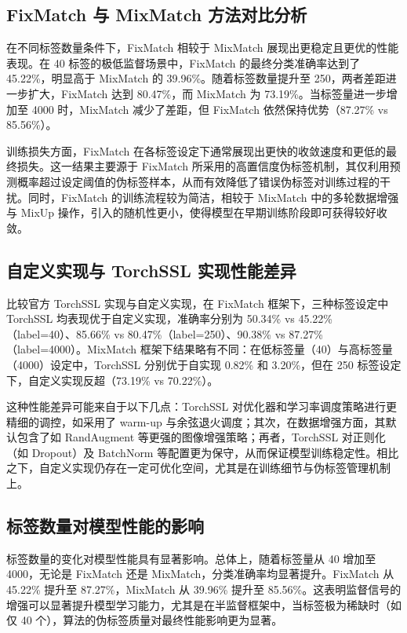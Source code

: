 \documentclass[a4paper, utf8]{ctexart}
\begin{document}
	\subsection{FixMatch 与 MixMatch 方法对比分析}
	
	在不同标签数量条件下，FixMatch 相较于 MixMatch 展现出更稳定且更优的性能表现。在 40 标签的极低监督场景中，FixMatch 的最终分类准确率达到了 45.22\%，明显高于 MixMatch 的 39.96\%。随着标签数量提升至 250，两者差距进一步扩大，FixMatch 达到 80.47\%，而 MixMatch 为 73.19\%。当标签量进一步增加至 4000 时，MixMatch 减少了差距，但 FixMatch 依然保持优势（87.27\% vs 85.56\%）。
	
	训练损失方面，FixMatch 在各标签设定下通常展现出更快的收敛速度和更低的最终损失。这一结果主要源于 FixMatch 所采用的高置信度伪标签机制，其仅利用预测概率超过设定阈值的伪标签样本，从而有效降低了错误伪标签对训练过程的干扰。同时，FixMatch 的训练流程较为简洁，相较于 MixMatch 中的多轮数据增强与 MixUp 操作，引入的随机性更小，使得模型在早期训练阶段即可获得较好收敛。
	
	\subsection{自定义实现与 TorchSSL 实现性能差异}
	
	比较官方 TorchSSL 实现与自定义实现，在 FixMatch 框架下，三种标签设定中 TorchSSL 均表现优于自定义实现，准确率分别为 50.34\% vs 45.22\%（label=40）、85.66\% vs 80.47\%（label=250）、90.38\% vs 87.27\%（label=4000）。MixMatch 框架下结果略有不同：在低标签量（40）与高标签量（4000）设定中，TorchSSL 分别优于自实现 0.82\% 和 3.20\%，但在 250 标签设定下，自定义实现反超（73.19\% vs 70.22\%）。
	
	这种性能差异可能来自于以下几点：TorchSSL 对优化器和学习率调度策略进行更精细的调控，如采用了 warm-up 与余弦退火调度；其次，在数据增强方面，其默认包含了如 RandAugment 等更强的图像增强策略；再者，TorchSSL 对正则化（如 Dropout）及 BatchNorm 等配置更为保守，从而保证模型训练稳定性。相比之下，自定义实现仍存在一定可优化空间，尤其是在训练细节与伪标签管理机制上。
	
	\subsection{标签数量对模型性能的影响}
	
	标签数量的变化对模型性能具有显著影响。总体上，随着标签量从 40 增加至 4000，无论是 FixMatch 还是 MixMatch，分类准确率均显著提升。FixMatch 从 45.22\% 提升至 87.27\%，MixMatch 从 39.96\% 提升至 85.56\%。这表明监督信号的增强可以显著提升模型学习能力，尤其是在半监督框架中，当标签极为稀缺时（如仅 40 个），算法的伪标签质量对最终性能影响更为显著。
	
\end{document}
